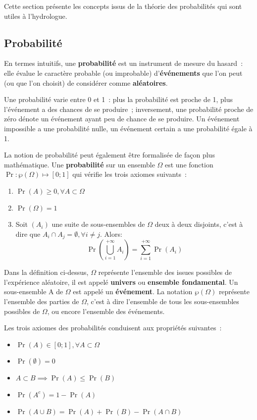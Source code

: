 \documentclass[
]{book}
\providecommand{\tightlist}{%
  \setlength{\itemsep}{0pt}\setlength{\parskip}{0pt}}
\begin{document}
Cette section présente les concepts issus de la théorie des probabilités qui sont utiles à l'hydrologue.

\subsection{Probabilité}\label{probabilituxe9}

En termes intuitifs, une \textbf{probabilité} est un instrument de mesure du hasard~: elle évalue le caractère probable (ou improbable) d'\textbf{événements} que l'on peut (ou que l'on choisit) de considérer comme \textbf{aléatoires}.

Une probabilité varie entre 0 et 1~: plus la probabilité est proche de 1, plus l'événement a des chances de se produire~; inversement, une probabilité proche de zéro dénote un événement ayant peu de chance de se produire. Un événement impossible a une probabilité nulle, un événement certain a une probabilité égale à 1.

La notion de probabilité peut également être formalisée de façon plus mathématique. Une \textbf{probabilité} sur un ensemble \(\Omega\) est une fonction \(\Pr:\wp(\Omega) \mapsto [0;1]\) qui vérifie les trois axiomes suivants~:

\begin{enumerate}
\def\labelenumi{\arabic{enumi}.}
\tightlist
\item
  \(\Pr(A) \geq 0, \forall A \subset \Omega\)
\item
  \(\Pr(\Omega)=1\)
\item
  Soit \((A_i)\) une suite de sous-ensembles de \(\Omega\) deux à deux disjoints, c'est à dire que \(A_i \cap A_j=\emptyset, \forall i \neq j\). Alors:
  \[\Pr \left( \bigcup_{i=1}^{+\infty} A_i\right)=\sum_{i=1}^{+\infty} \Pr \left( A_i\right)\]
\end{enumerate}

Dans la définition ci-dessus, \(\Omega\) représente l'ensemble des issues possibles de l'expérience aléatoire, il est appelé \textbf{univers} ou \textbf{ensemble fondamental}. Un sous-ensemble A de \(\Omega\) est appelé un \textbf{événement}. La notation \(\wp(\Omega)\) représente l'ensemble des parties de \(\Omega\), c'est à dire l'ensemble de tous les sous-ensembles possibles de \(\Omega\), ou encore l'ensemble des événements.

Les trois axiomes des probabilités conduisent aux propriétés suivantes~:

\begin{itemize}
\tightlist
\item
  \(\Pr(A)\in [0;1], \forall A \subset \Omega\)
\item
  \(\Pr(\emptyset)=0\)
\item
  \(A \subset B \implies \Pr(A) \leq \Pr(B)\)
\item
  \(\Pr(A^c)=1 - \Pr(A)\)
\item
  \(\Pr(A \cup B)=\Pr(A)+\Pr(B)-\Pr(A \cap B)\)
\end{itemize}
\end{document}
